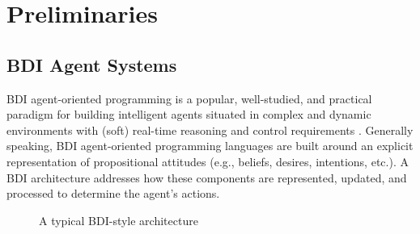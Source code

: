 \section{Preliminaries}\label{sec:preliminaries}

\newcommand{\success}{\mbox{\emph{succ}}}
\newcommand{\failure}{\mbox{\emph{fail}}}

\newcommand{\procedurefont}[1]{\mathsf{#1}}
\newcommand{\StableGoal}{\procedurefont{StableGoal}}
\newcommand{\RecordTrace}{\procedurefont{RecordFailedTrace}}
\newcommand{\RecordWorldDT}{\procedurefont{RecordWorldDT}}



\subsection{BDI Agent Systems}\label{sec:bdi_programming}

BDI agent-oriented programming is a popular, well-studied, and practical paradigm
for building intelligent agents situated in complex and dynamic environments with
(soft) real-time reasoning and control requirements
\cite{Georgeff89-PRS,Benfield:AAMAS06}.
Generally speaking, BDI agent-oriented programming languages are built
around an 
explicit representation of propositional attitudes (e.g., beliefs, desires,
intentions, etc.). A BDI architecture addresses how these components are
represented, updated, and processed to determine the agent's actions.


\begin{figure}[t]
\begin{center}
\resizebox{.6\textwidth}{!}{}
\end{center}
\vskip -0.5cm
\caption{A typical BDI-style architecture}
\label{fig:bdiarch}
\end{figure}


